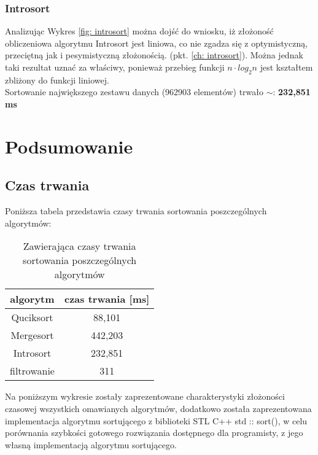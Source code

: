 \documentclass[12pt]{article}
\begin{document}
\subsubsection{Introsort}
Analizując Wykres \ref{fig: introsort} można dojść do wniosku, iż złożoność obliczeniowa algorytmu Introsort jest
liniowa, co nie zgadza się z optymistyczną, przeciętną jak i pesymistyczną złożonością. (pkt. \ref{ch: introsort}). Można 
jednak taki rezultat uznać za właściwy, ponieważ przebieg funkcji $n \cdot log_2 n$ jest kształtem zbliżony do funkcji 
liniowej.\\

Sortowanie największego zestawu danych (962903 elementów) trwało $\sim$: \textbf{232,851 ms}

\section{Podsumowanie}
\subsection{Czas trwania}
Poniższa tabela przedstawia czasy trwania sortowania poszczególnych algorytmów:

\begin{table}[H]
       \centering
       \caption{Zawierająca czasy trwania sortowania poszczególnych algorytmów}
       \begin{tabular}{|c|c|}
       \hline
       algorytm  & czas trwania {[}ms{]} \\ \hline
       Quciksort & 88,101               \\ \hline
       Mergesort & 442,203               \\ \hline
       Introsort & 232,851               \\ \hline
       filtrowanie &    311             \\ \hline
       \end{tabular}
       \label{tab: czasy}
       \end{table}

       Na poniższym wykresie zostały zaprezentowane charakterystyki złożoności czasowej wszystkich omawianych 
       algorytmów, dodatkowo została zaprezentowana  implementacja algorytmu sortującego z
       biblioteki STL C++ std :: sort(), w celu porównania szybkości gotowego rozwiązania dostępnego dla
       programisty, z jego własną implementacją algorytmu sortującego.
\end{document}
